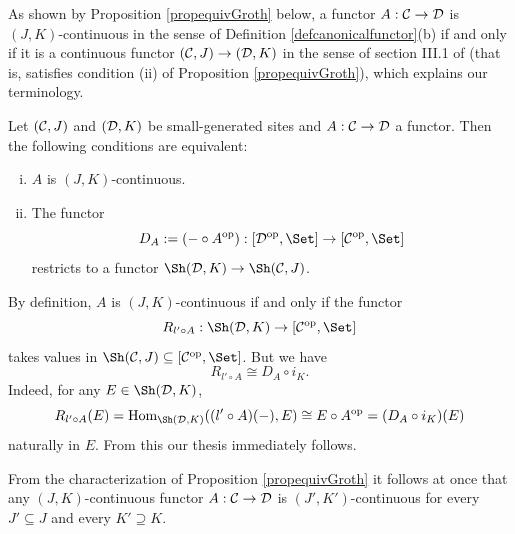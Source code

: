 \documentclass[a4paper,12pt]{article}
\begin{document}
As shown by Proposition \ref{propequivGroth} below, a functor $A:{\cal C}\to {\cal D}$ is $(J, K)$-continuous in the sense of Definition \ref{defcanonicalfunctor}(b) if and only if it is a continuous functor $({\cal C}, J)\to ({\cal D}, K)$ in the sense of section III.1 of \cite{grothendieck} (that is, satisfies condition (ii) of Proposition \ref{propequivGroth}), which explains our terminology.

\begin{proposition}\label{propequivGroth}
	Let $({\cal C}, J)$ and $({\cal D}, K)$ be small-generated sites and  $A:{\cal C} \to {\cal D}$ a functor. Then the following conditions are equivalent:
\begin{enumerate}[(i)]
	\item $A$ is $(J, K)$-continuous.
	
	\item The functor $$D_{A}:=(-\circ A^{\textup{op}}):[{\cal D}^{\textup{op}}, \Set]\to [{\cal C}^{\textup{op}}, \Set]$$ restricts to a functor $\Sh({\cal D}, K) \to \Sh({\cal C}, J)$.	
	\end{enumerate}
\end{proposition}

\begin{proofs}
By definition, $A$ is $(J, K)$-continuous if and only if the functor 
\[
R_{l'\circ A}:\Sh({\cal D}, K)\to [{\cal C}^{\textup{op}}, \Set]
\]
takes values in $\Sh({\cal C}, J)\subseteq [{\cal C}^{\textup{op}}, \Set]$. But we have
\[
R_{l'\circ A} \cong D_{A}\circ i_{K}.
\]  
Indeed, for any $E\in \Sh({\cal D}, K)$, 
\[
R_{l'\circ A}(E)= \textup{Hom}_{\Sh({\cal D}, K)}((l'\circ A)(-), E)\cong E\circ A^{\textup{op}}=(D_{A}\circ i_{K})(E)
\]
naturally in $E$. From this our thesis immediately follows.	
\end{proofs}

\begin{remark}\label{remhereditarycontinuity}
From the characterization of Proposition \ref{propequivGroth} it follows at once that any $(J, K)$-continuous functor $A:{\cal C}\to {\cal D}$ is $(J', K')$-continuous for every $J'\subseteq J$ and every $K'\supseteq K$. 	
\end{remark}
\end{document}
